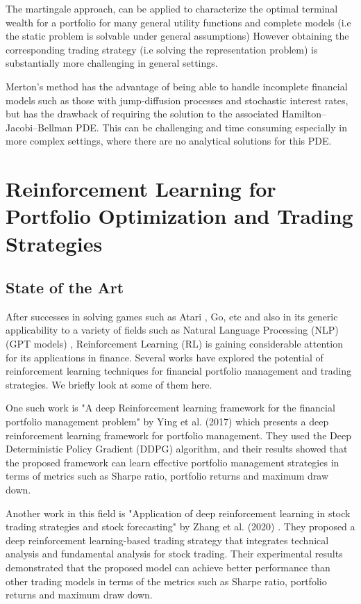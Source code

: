 The martingale approach, can be applied to characterize the optimal terminal wealth for a portfolio for many general utility functions and complete models (i.e the static problem is solvable under general assumptions) However obtaining the corresponding trading strategy (i.e solving the representation problem) is substantially more challenging in general settings.

Merton's method has the advantage of being able to handle incomplete financial models such as those with jump-diffusion processes and stochastic interest rates, but has the drawback of requiring the solution to the associated Hamilton–Jacobi–Bellman PDE. This can be challenging and time consuming especially in more complex settings, where there are no analytical solutions for this PDE.


\section{Reinforcement Learning for Portfolio Optimization and Trading Strategies}
\subsection{State of the Art}
After successes in solving games such as Atari \cite{mnih2015human}, Go, etc and also in its generic applicability to a  variety of fields such  as Natural Language Processing (NLP) (GPT models) \cite{brown2020language}, Reinforcement Learning (RL) is gaining considerable attention for its applications in finance. Several works have explored the potential of reinforcement learning techniques for financial portfolio management and trading strategies. We briefly look at some of them here.

One such work is "A deep Reinforcement learning framework for the financial portfolio management problem" by Ying et al. (2017) \cite{ying2017deep} which presents a deep reinforcement learning framework for portfolio management. They used the Deep Deterministic Policy Gradient (DDPG) algorithm, and their results showed that the proposed framework can learn effective portfolio management strategies in terms of metrics such as Sharpe ratio, portfolio returns and maximum draw down.

Another work in this field is "Application of deep reinforcement learning in stock trading strategies and stock forecasting" by Zhang et al. (2020) \cite{zhang2020application}. They proposed a deep reinforcement learning-based trading strategy that integrates technical analysis and fundamental analysis for stock trading. Their experimental results demonstrated that the proposed model can achieve better performance than other trading models in terms of the metrics such as Sharpe ratio, portfolio returns and maximum draw down.

